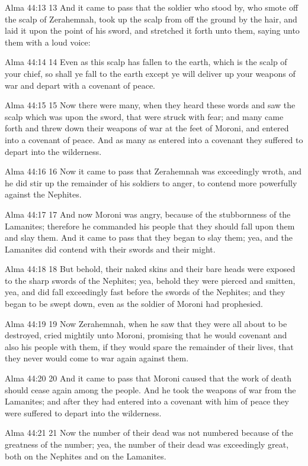 Alma 44:13
 13 And it came to pass that the soldier who stood by, who smote
off the scalp of Zerahemnah, took up the scalp from off the
ground by the hair, and laid it upon the point of his sword, and
stretched it forth unto them, saying unto them with a loud voice:

Alma 44:14
 14 Even as this scalp has fallen to the earth, which is the
scalp of your chief, so shall ye fall to the earth except ye will
deliver up your weapons of war and depart with a covenant of
peace.

Alma 44:15
 15 Now there were many, when they heard these words and saw the
scalp which was upon the sword, that were struck with fear; and
many came forth and threw down their weapons of war at the feet
of Moroni, and entered into a covenant of peace. And as many as
entered into a covenant they suffered to depart into the
wilderness.

Alma 44:16
 16 Now it came to pass that Zerahemnah was exceedingly wroth,
and he did stir up the remainder of his soldiers to anger, to
contend more powerfully against the Nephites.

Alma 44:17
 17 And now Moroni was angry, because of the stubbornness of the
Lamanites; therefore he commanded his people that they should
fall upon them and slay them. And it came to pass that they
began to slay them; yea, and the Lamanites did contend with their
swords and their might.

Alma 44:18
 18 But behold, their naked skins and their bare heads were
exposed to the sharp swords of the Nephites; yea, behold they
were pierced and smitten, yea, and did fall exceedingly fast
before the swords of the Nephites; and they began to be swept
down, even as the soldier of Moroni had prophesied.

Alma 44:19
 19 Now Zerahemnah, when he saw that they were all about to be
destroyed, cried mightily unto Moroni, promising that he would
covenant and also his people with them, if they would spare the
remainder of their lives, that they never would come to war again
against them.

Alma 44:20
 20 And it came to pass that Moroni caused that the work of death
should cease again among the people. And he took the weapons of
war from the Lamanites; and after they had entered into a
covenant with him of peace they were suffered to depart into the
wilderness.

Alma 44:21
 21 Now the number of their dead was not numbered because of the
greatness of the number; yea, the number of their dead was
exceedingly great, both on the Nephites and on the Lamanites.


